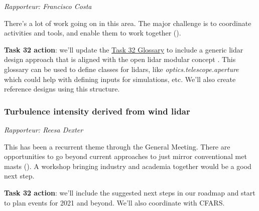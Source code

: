 \emph{Rapporteur: Francisco Costa}

There's a lot of work going on in this area. The major challenge is to coordinate activities and tools, and enable them to work together ().

\begin{taskactions}
\textbf{Task 32 action}: we'll update the \href{https://github.com/IEA-Wind-Task-32/wind-lidar-glossary}{Task 32 Glossary} to include a generic lidar design approach that is aligned with the open lidar modular concept \cite{clifton_2019_openlidar}. This glossary can be used to define classes for lidars, like \emph{optics.telescope.aperture} which could help with defining inputs for simulations, etc. We'll also create reference designs using this structure.
\end{taskactions}

\subsubsection{Turbulence intensity derived from wind lidar}

\emph{Rapporteur: Reesa Dexter}

This has been a recurrent theme through the General Meeting. There are opportunities to go beyond current approaches to just mirror conventional met masts (). A workshop bringing industry and academia together would be a good next step.


\begin{taskactions}
\textbf{Task 32 action}: we'll include the suggested next steps in our roadmap and start to plan events for 2021 and beyond. We'll also coordinate with CFARS.
\end{taskactions}

